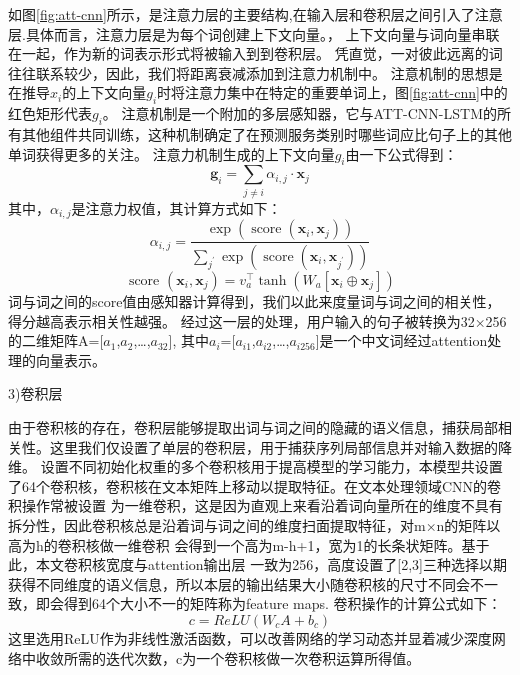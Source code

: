   如图\ref{fig:att-cnn}所示，是注意力层的主要结构,在输入层和卷积层之间引入了注意层.具体而言，注意力层是为每个词创建上下文向量。，
  上下文向量与词向量串联在一起，作为新的词表示形式将被输入到到卷积层。 凭直觉，一对彼此远离的词往往联系较少，因此，我们将距离衰减添加到注意力机制中。 
  注意机制的思想是在推导$x_{i}$的上下文向量$g_{i}$时将注意力集中在特定的重要单词上，图\ref{fig:att-cnn}中的红色矩形代表$g_{i}$。 
  注意机制是一个附加的多层感知器，它与ATT-CNN-LSTM的所有其他组件共同训练，这种机制确定了在预测服务类别时哪些词应比句子上的其他单词获得更多的关注。
  注意力机制生成的上下文向量$g_{i}$由一下公式得到：
  \begin{equation}
  \mathbf{g}_{i}=\sum_{j \neq i} \alpha_{i, j} \cdot \mathbf{x}_{j}
\end{equation}
其中，$\alpha_{i, j}$是注意力权值，其计算方式如下：
\begin{equation}
\alpha_{i, j}=\frac{\exp \left(\operatorname{score}\left(\mathbf{x}_{i}, \mathbf{x}_{j}\right)\right)}{\sum_{j^{\prime}} \exp \left(\operatorname{score}\left(\mathbf{x}_{i}, \mathbf{x}_{j^{\prime}}\right)\right)}
\end{equation}
\begin{equation}
\text { score }\left(\mathbf{x}_{i}, \mathbf{x}_{j}\right)=v_{a}^{\top} \tanh \left(W_{a}\left[\mathbf{x}_{i} \oplus \mathbf{x}_{j}\right]\right)
\end{equation}
词与词之间的score值由感知器计算得到，我们以此来度量词与词之间的相关性，得分越高表示相关性越强。
经过这一层的处理，用户输入的句子被转换为32×256的二维矩阵A=[$a_{1}$,$a_{2}$,\dots,$a_{32}$],
其中$a_{i}$=[$a_{i1}$,$a_{i2}$,\dots,$a_{i256}$]是一个中文词经过attention处理的向量表示。

  3)卷积层

  由于卷积核的存在，卷积层能够提取出词与词之间的隐藏的语义信息，捕获局部相关性。这里我们仅设置了单层的卷积层，用于捕获序列局部信息并对输入数据的降维。
  设置不同初始化权重的多个卷积核用于提高模型的学习能力，本模型共设置了64个卷积核，卷积核在文本矩阵上移动以提取特征。在文本处理领域CNN的卷积操作常被设置
  为一维卷积，这是因为直观上来看沿着词向量所在的维度不具有拆分性，因此卷积核总是沿着词与词之间的维度扫面提取特征，对m×n的矩阵以高为h的卷积核做一维卷积
  会得到一个高为m-h+1，宽为1的长条状矩阵。基于此，本文卷积核宽度与attention输出层
  一致为256，高度设置了[2,3]三种选择以期获得不同维度的语义信息，所以本层的输出结果大小随卷积核的尺寸不同会不一致，即会得到64个大小不一的矩阵称为feature maps.
  卷积操作的计算公式如下：
  \begin{equation}
    c=ReLU(W_{c}A+b_{c})
    \end{equation}
    这里选用ReLU作为非线性激活函数，可以改善网络的学习动态并显着减少深度网络中收敛所需的迭代次数，c为一个卷积核做一次卷积运算所得值。

